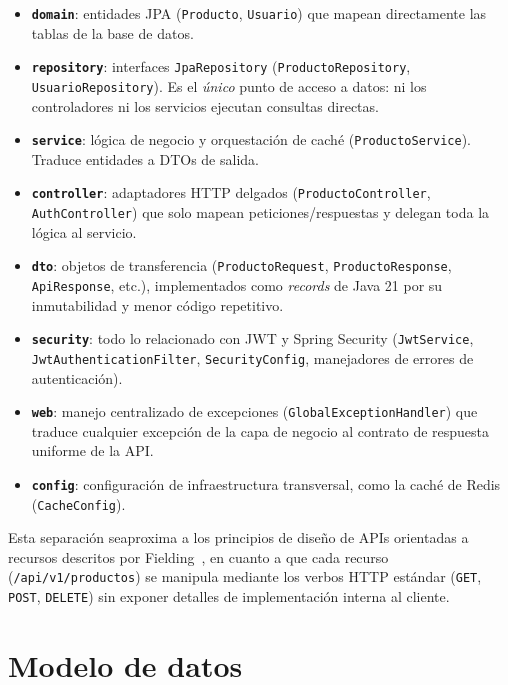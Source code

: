 \documentclass[11pt,a4paper]{article}
\begin{document}
\begin{itemize}[noitemsep]
    \item \textbf{\texttt{domain}}: entidades JPA (\texttt{Producto},
        \texttt{Usuario}) que mapean directamente las tablas de la base de datos.
    \item \textbf{\texttt{repository}}: interfaces \texttt{JpaRepository}
        (\texttt{ProductoRepository}, \texttt{UsuarioRepository}). Es el
        \emph{único} punto de acceso a datos: ni los controladores ni los
        servicios ejecutan consultas directas.
    \item \textbf{\texttt{service}}: lógica de negocio y orquestación de caché
        (\texttt{ProductoService}). Traduce entidades a DTOs de salida.
    \item \textbf{\texttt{controller}}: adaptadores HTTP delgados
        (\texttt{ProductoController}, \texttt{AuthController}) que solo mapean
        peticiones/respuestas y delegan toda la lógica al servicio.
    \item \textbf{\texttt{dto}}: objetos de transferencia (\texttt{ProductoRequest},
        \texttt{ProductoResponse}, \texttt{ApiResponse}, etc.), implementados como
        \emph{records} de Java 21 por su inmutabilidad y menor código repetitivo.
    \item \textbf{\texttt{security}}: todo lo relacionado con JWT y Spring
        Security (\texttt{JwtService}, \texttt{JwtAuthenticationFilter},
        \texttt{SecurityConfig}, manejadores de errores de autenticación).
    \item \textbf{\texttt{web}}: manejo centralizado de excepciones
        (\texttt{GlobalExceptionHandler}) que traduce cualquier excepción de la
        capa de negocio al contrato de respuesta uniforme de la API.
    \item \textbf{\texttt{config}}: configuración de infraestructura transversal,
        como la caché de Redis (\texttt{CacheConfig}).
\end{itemize}

Esta separación seaproxima a los principios de diseño de APIs orientadas a
recursos descritos por Fielding~\cite{fielding2000rest}, en cuanto a que cada
recurso (\texttt{/api/v1/productos}) se manipula mediante los verbos HTTP
estándar (\texttt{GET}, \texttt{POST}, \texttt{DELETE}) sin exponer detalles de
implementación interna al cliente.

\section{Modelo de datos}
\end{document}
